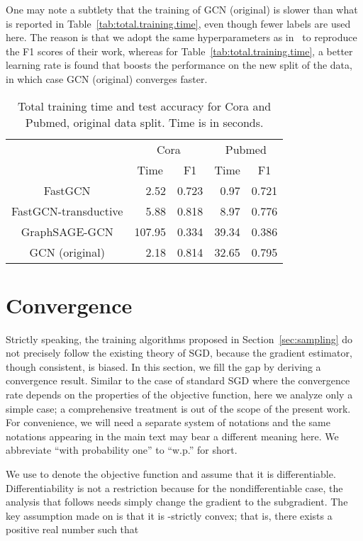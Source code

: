 \documentclass{article} \usepackage{iclr2018_conference,times}
\newcommand{\wpone}{w.p.}
\theoremstyle{plain}\newtheorem{theorem}{Theorem}\theoremstyle{plain}\newtheorem{proposition}[theorem]{Proposition}
\theoremstyle{plain}\newtheorem{corollary}[theorem]{Corollary}
\theoremstyle{plain}\newtheorem{lemma}[theorem]{Lemma}
\begin{document}
One may note a subtlety that the training of GCN (original) is slower than what is reported in Table~\ref{tab:total.training.time}, even though fewer labels are used here. The reason is that we adopt the same hyperparameters as in~\cite{DBLP:journals/corr/KipfW16} to reproduce the F1 scores of their work, whereas for Table~\ref{tab:total.training.time}, a better learning rate is found that boosts the performance on the new split of the data, in which case GCN (original) converges faster.

\begin{table}[ht]
\centering
\caption{Total training time and test accuracy for Cora and Pubmed, original data split. Time is in seconds.}
\label{tab:original.split}
\begin{tabular}{crcrc}
\hline
& \multicolumn{2}{c}{Cora}& \multicolumn{2}{c}{Pubmed}\\
& \multicolumn{1}{c}{Time} & F1 & \multicolumn{1}{c}{Time} & F1\\\hline
FastGCN              &   2.52 & 0.723 &  0.97 & 0.721\\
FastGCN-transductive &   5.88 & 0.818 &  8.97 & 0.776\\
GraphSAGE-GCN        & 107.95 & 0.334 & 39.34 & 0.386\\
GCN (original)       &   2.18 & 0.814 & 32.65 & 0.795\\
\hline
\end{tabular}
\end{table}

\section{Convergence}

Strictly speaking, the training algorithms proposed in Section~\ref{sec:sampling} do not precisely follow the existing theory of SGD, because the gradient estimator, though consistent, is biased. In this section, we fill the gap by deriving a convergence result. Similar to the case of standard SGD where the convergence rate depends on the properties of the objective function, here we analyze only a simple case; a comprehensive treatment is out of the scope of the present work. For convenience, we will need a separate system of notations and the same notations appearing in the main text may bear a different meaning here. We abbreviate ``with probability one'' to ``\wpone'' for short.

We use  to denote the objective function and assume that it is differentiable. Differentiability is not a restriction because for the nondifferentiable case, the analysis that follows needs simply change the gradient to the subgradient. The key assumption made on  is that it is -strictly convex; that is, there exists a positive real number  such that
\end{document}
